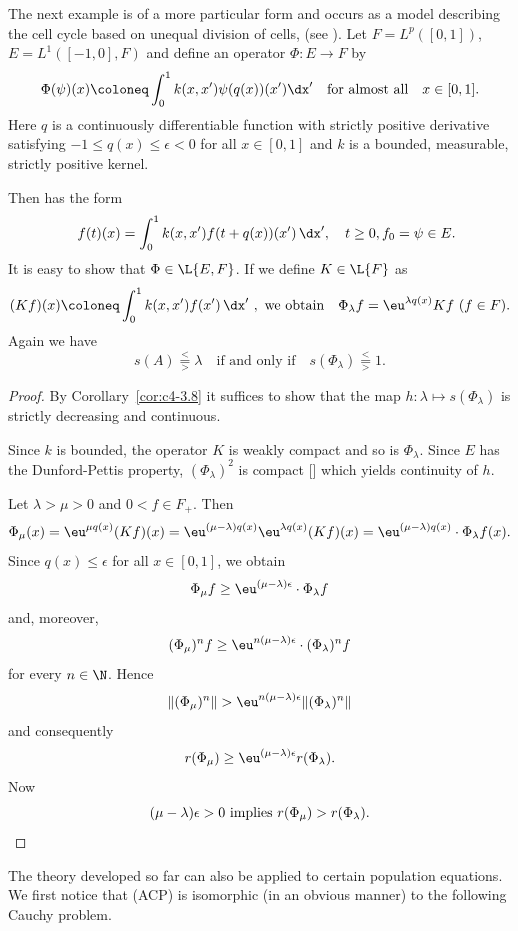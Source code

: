 \begin{example}\label{ex:c4-3.11}
The next example is of a more particular form and occurs as a model describing the cell cycle based on unequal division of cells, (see  \textcite{arinokimmel:1985}).
Let $F = L^{p}([0,1])$,\, $E = L^{1}([-1,0], F)$ and define an operator $\Phi \colon E \to F$ by
\[
\Phi(\psi)(x) \coloneq \int_0^1 k(x,x')\psi(q(x))(x') \dx' \quad \text{for almost all} \quad x \in [0,1].
\]
Here $q$ is a continuously differentiable function with strictly positive derivative satisfying $-1 \leq q(x) \leq \epsilon < 0$ for all $x \in [0,1]$ and $k$ is a bounded, measurable, strictly positive kernel.

Then  has the form
\begin{equation} \label{eq:c4-3.12}
\quad f(t)(x) = \int_{0}^{1} k(x,x')f(t+q(x))(x') \, \dx', \quad t \geq 0, f_{0} = \psi \in E.
\end{equation}
It is easy to show that $\Phi \in \L{E,F}$.
If we define $K \in \L{F}$  as 
\[
(Kf)(x) \coloneq \int_{0}^{1} k(x,x')f(x') \, \dx' \ ,
\ \text{we obtain} \quad 
\Phi_{\lambda}f = \eu^{\lambda q(x)}Kf \,\, (f \in F) .
\]
Again we have 
\begin{equation*}\label{eq:c4-3.12-kgk1}
s(A) \overset{<}{ \underset{>}{=} }\lambda \quad \text{if and only if} \quad s(\Phi_{\lambda}) \overset{<}{ \underset{>}{=} } 1  .
\end{equation*}
\end{example}
\begin{proof}
By Corollary~\ref{cor:c4-3.8} it suffices to show that the map $h \colon \lambda \mapsto s(\Phi_{\lambda})$ is strictly decreasing and continuous.

Since $k$ is bounded, the operator $K$ is weakly compact and so is $\Phi_{\lambda}$.
Since $E$ has the Dunford-Pettis property, $(\Phi_{\lambda})^{2}$ is compact [\textcite[Theorem II.9.9]{schaefer:1974}] which yields continuity of\/ $h$.

Let $\lambda > \mu > 0$ and $0 < f \in F_{+}$.
Then 
\[
\Phi_{\mu}(x) = 
\eu^{\mu q(x)}(Kf)(x) = 
\eu^{(\mu-\lambda)q(x)}\eu^{\lambda q(x)}(Kf)(x) =
\eu^{(\mu-\lambda)q(x)} \cdot \Phi_{\lambda}f(x) .
\]
Since $q(x) \leq \epsilon$ for all $x \in [0,1]$, we obtain 
\[
\Phi_{\mu}f \geq \eu^{(\mu-\lambda)\epsilon} \cdot \Phi_{\lambda}f
\]
and, moreover, 
\[
(\Phi_{\mu})^n f \geq \eu^{n(\mu-\lambda)\epsilon} \cdot (\Phi_{\lambda})^n f
\]
for every $n \in \N$.
Hence 
\[
\|(\Phi_{\mu})^n\| > \eu^{n(\mu-\lambda)\epsilon}\|(\Phi_{\lambda})^n\|
\]
and consequently 
\[
r(\Phi_{\mu}) \geq \eu^{(\mu-\lambda)\epsilon}r(\Phi_{\lambda}) .
\]
Now 
\begin{equation*}
\text{$(\mu-\lambda)\epsilon > 0$ implies 
$r(\Phi_{\mu}) > r(\Phi_{\lambda})$.}
\qedhere
\end{equation*}
\end{proof}
The theory developed so far can also be applied to certain population equations.
We first notice that (ACP) is isomorphic (in an obvious manner) to the following Cauchy problem.

